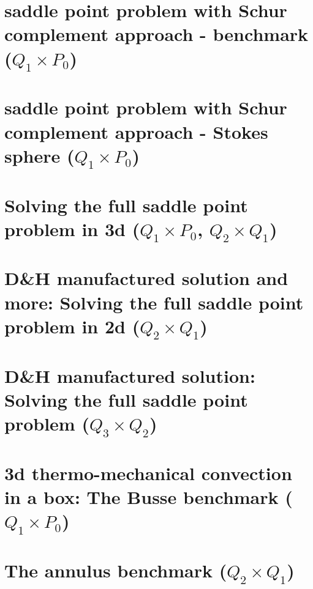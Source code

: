 \documentclass[a4paper,11pt]{report}
\begin{document}
\chapter{saddle point problem with Schur complement approach - benchmark ($Q_1\times P_0$)\label{f15}} %

\chapter{saddle point problem with Schur complement approach - Stokes sphere ($Q_1\times P_0$) \label{f16}} %

\chapter{Solving the full saddle point problem in 3d ($Q_1\times P_0$, $Q_2\times Q_1$)\label{f17}} %

\chapter{D\&H manufactured solution and more: Solving the full saddle point problem in 2d ($Q_2\times Q_1$) \label{f18}} %

\chapter{D\&H manufactured solution: Solving the full saddle point problem ($Q_3\times Q_2$)  \label{f19}} %

\chapter{3d thermo-mechanical convection in a box: The Busse benchmark ($Q_1\times P_0$) \label{f20}} %

\chapter{The annulus benchmark ($Q_2\times Q_1$) \label{f21}} %
\end{document}
